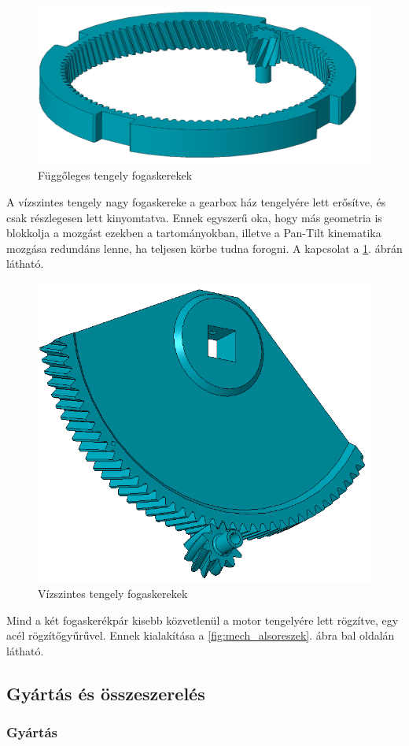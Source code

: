 \documentclass[12pt,a4paper]{article}
\begin{document}
\begin{figure}[h!]
	\centering
	\includegraphics[width=0.1\linewidth]{mech_fogpar1}
	\caption{Függőleges tengely fogaskerekek}
	\label{fig:mech_fogpar1}
\end{figure}

A vízszintes tengely nagy fogaskereke a gearbox ház tengelyére lett erősítve, és csak részlegesen lett kinyomtatva. Ennek egyszerű oka, hogy más geometria is blokkolja a mozgást ezekben a tartományokban, illetve a Pan-Tilt kinematika mozgása redundáns lenne, ha teljesen körbe tudna forogni. A kapcsolat a \ref{fig:mech_fogpar1}. ábrán látható.

\begin{figure}[h!]
	\centering
	\includegraphics[width=0.1\linewidth]{mech_fogpar2}
	\caption{Vízszintes tengely fogaskerekek}
	\label{fig:mech_fogpar2}
\end{figure}

Mind a két fogaskerékpár kisebb közvetlenül a motor tengelyére lett rögzítve, egy acél rögzítőgyűrűvel. Ennek kialakítása a \ref{fig:mech_alsoreszek}. ábra bal oldalán látható.

\pagebreak

\subsection{Gyártás és összeszerelés}
\subsubsection{Gyártás}
\end{document}
